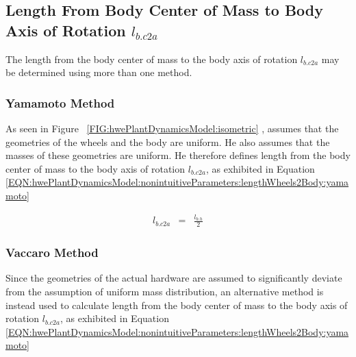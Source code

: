 \documentclass[crop=false,float=true,class=scrreprt]{standalone}
\begin{document}
\subsection{Length From Body Center of Mass to Body Axis of Rotation $l_{b.c2a}$}
\label{SEC:hwePlantDynamicsModel:nonintuitiveParameters:lengthBodyc2a}

The length from the body center of mass to the body axis of rotation $l_{b.c2a}$
may be determined using more than one method.

\subsubsection{Yamamoto Method}
\label{SEC:hwePlantDynamicsModel:nonintuitiveParameters:lengthWheels2Body:yamamoto}

As seen in Figure~%
\ref{FIG:hwePlantDynamicsModel:isometric}
{},
\textcite{REF:online:2009-yamamoto} 
assumes that the geometries of the wheels and the body are uniform.
He also assumes that the masses of these geometries are uniform.
He therefore defines 
length from the body center of mass to the body axis of rotation $l_{b.c2a}$,
as exhibited in Equation~%
\eqref{EQN:hwePlantDynamicsModel:nonintuitiveParameters:lengthWheels2Body:yamamoto}




\begin{equation}
\label{EQN:hwePlantDynamicsModel:nonintuitiveParameters:lengthWheels2Body:yamamoto}
\begin{array}{ccc}
l_{b.c2a}
& = &
\displaystyle\frac{l_{b.h}}{2}
\end{array}
\end{equation}




\clearpage




\subsubsection{Vaccaro Method}
\label{SEC:hwePlantDynamicsModel:nonintuitiveParameters:lengthWheels2Body:vaccaro}

Since the geometries of the actual hardware are assumed 
to significantly deviate from the assumption of uniform mass distribution,
an alternative method is instead used to calculate
length from the body center of mass to the body axis of rotation $l_{b.c2a}$,
as exhibited in Equation~%
\eqref{EQN:hwePlantDynamicsModel:nonintuitiveParameters:lengthWheels2Body:yamamoto}
\end{document}

